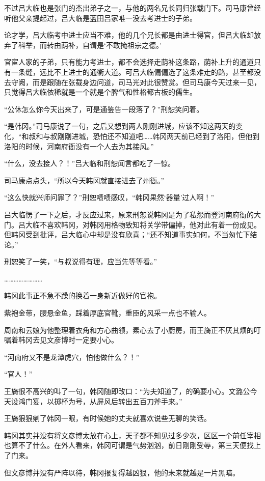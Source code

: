 不过吕大临也是张门的杰出弟子之一，与他的两名兄长同归张载门下。司马康曾经听他父亲提起过，吕大临是蓝田吕家唯一没去考进士的子弟。

论才学，吕大临考中进士应当不难，他的几个兄长都是由进士得官，但吕大临却放弃了科举，而转由荫补，自谓是‘不敢掩祖宗之德。’

官宦人家的子弟，只有能力考进士，都不会选择走荫补这条路，荫补上升的通道只有一条缝，远比不上进士的通衢大道。可吕大临偏偏选了这条难走的路，甚至都没去守阙，而是跟随在张载身边问道，司马光对此很赞赏。但司马康今天过来一见，只觉得吕大临依稀就是一个就是个脾气和性格都古板的儒生。

“公休怎么你今天出来了，可是通鉴告一段落了？”刑恕笑问着。

“是韩冈。”司马康说了一句，之后又想到两人刚刚进城，应该不知这两天的变化，“和叔和与叔刚刚进城，恐怕还不知道吧……韩冈两天前已经到了洛阳，但他到洛阳的时候，河南府衙没有一个人去为其接风。”

“什么，没去接人？！”吕大临和刑恕闻言都吃了一惊。

司马康点点头，“所以今天韩冈就直接进去了州衙。”

“这么快就兴师问罪了？”刑恕啧啧感叹，“韩冈果然‘器量’过人啊！”

吕大临愣了一下之后，才反应过来，原来刑恕说韩冈是为了私怨而登河南府衙的大门。吕大临不喜欢韩冈，对韩冈用格物致知将关学带偏掉，他对此有着一份成见。但韩冈受到批评，吕大临心中却是没有欣喜；“还不知道事实如何，不当匆忙下结论。”

刑恕笑了一笑，“与叔说得有理，应当先等等看。”

……………………

韩冈此事正不急不躁的换着一身新近做好的官袍。

紫袍金带，腰悬金鱼，踩着厚底官靴，重臣的风采一点也不输人。

周南和云娘为他整理着衣角和方心曲领，素心去了小厨房，而王旖正不厌其烦的叮嘱着韩冈去见文彦博时一定要小心。

“河南府又不是龙潭虎穴，怕他做什么？！”

“官人！”

王旖很不高兴的叫了一句，韩冈随即改口：“为夫知道了，的确要小心。文潞公今天设鸿门宴，以掷杯为号，从屏风后转出五百刀斧手来。”

王旖狠狠剜了韩冈一眼，有时候她的丈夫就喜欢说些无聊的笑话。

韩冈其实并没有将文彦博太放在心上，天子都不知见过多少次，区区一个前任宰相也算不了什么。在外人看来，韩冈可谓是气势汹汹，前日刚刚受辱，第三天便找上了门来。

但文彦博并没有严阵以待，韩冈报复得越凶狠，他的未来就越是一片黑暗。

